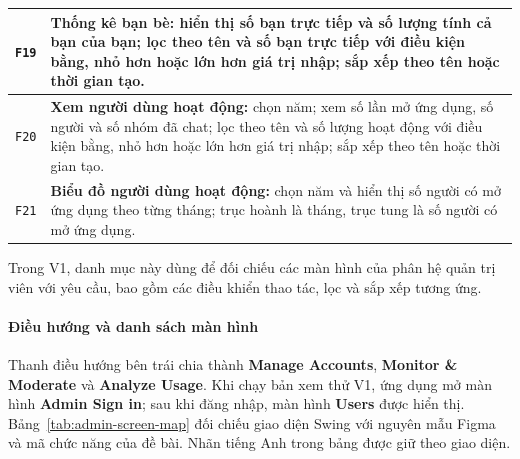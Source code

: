 \begin{longtable}{|C{1.2cm}|L{\dimexpr\textwidth-1.2cm-4\arrayrulewidth\relax}|}
  \hline
  \hypertarget{F19}{\texttt{F19}} &
  \textbf{Thống kê bạn bè:} hiển thị số bạn trực tiếp và số lượng tính cả
  bạn của bạn; lọc theo tên và số bạn trực tiếp với điều kiện bằng, nhỏ hơn
  hoặc lớn hơn giá trị nhập; sắp xếp theo tên hoặc thời gian tạo.\\
  \hline
  \hypertarget{F20}{\texttt{F20}} &
  \textbf{Xem người dùng hoạt động:} chọn năm; xem số lần mở
  ứng dụng, số người và số nhóm đã chat; lọc theo tên và số lượng hoạt động
  với điều kiện bằng, nhỏ hơn hoặc lớn hơn giá trị nhập;
  sắp xếp theo tên hoặc thời gian tạo.\\
  \hline
  \hypertarget{F21}{\texttt{F21}} &
  \textbf{Biểu đồ người dùng hoạt động:} chọn năm và hiển thị số người có
  mở ứng dụng theo từng tháng; trục hoành là tháng, trục tung là số người
  có mở ứng dụng.\\
  \hline
\end{longtable}
\endgroup

Trong V1, danh mục này dùng để đối chiếu các màn hình của phân hệ quản trị viên
với yêu cầu, bao gồm các điều khiển thao tác, lọc và sắp xếp tương ứng.

\paragraph{Điều hướng và danh sách màn hình}
\label{par:admin-navigation}
\mbox{}\par
Thanh điều hướng bên trái chia thành \textbf{Manage Accounts},
\textbf{Monitor \& Moderate} và \textbf{Analyze Usage}. Khi chạy bản xem thử V1,
ứng dụng mở màn hình \textbf{Admin Sign in}; sau khi đăng nhập, màn hình
\textbf{Users} được hiển thị. Bảng~\ref{tab:admin-screen-map}
đối chiếu giao diện Swing với nguyên mẫu Figma và mã chức năng của đề bài.
Nhãn tiếng Anh trong bảng được giữ theo giao diện.

